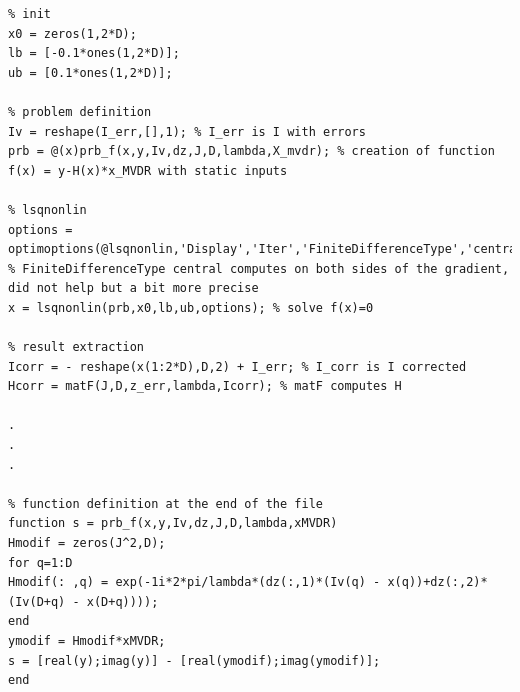 \documentclass[titlepage]{article}
\begin{document}
\begin{verbatim}
% init
x0 = zeros(1,2*D);
lb = [-0.1*ones(1,2*D)];
ub = [0.1*ones(1,2*D)];

% problem definition
Iv = reshape(I_err,[],1); % I_err is I with errors
prb = @(x)prb_f(x,y,Iv,dz,J,D,lambda,X_mvdr); % creation of function f(x) = y-H(x)*x_MVDR with static inputs

% lsqnonlin
options = optimoptions(@lsqnonlin,'Display','Iter','FiniteDifferenceType','central'); % FiniteDifferenceType central computes on both sides of the gradient, did not help but a bit more precise
x = lsqnonlin(prb,x0,lb,ub,options); % solve f(x)=0

% result extraction
Icorr = - reshape(x(1:2*D),D,2) + I_err; % I_corr is I corrected
Hcorr = matF(J,D,z_err,lambda,Icorr); % matF computes H 

.
.
.

% function definition at the end of the file
function s = prb_f(x,y,Iv,dz,J,D,lambda,xMVDR)
Hmodif = zeros(J^2,D);
for q=1:D
Hmodif(: ,q) = exp(-1i*2*pi/lambda*(dz(:,1)*(Iv(q) - x(q))+dz(:,2)*(Iv(D+q) - x(D+q))));
end 
ymodif = Hmodif*xMVDR;
s = [real(y);imag(y)] - [real(ymodif);imag(ymodif)];
end

\end{verbatim}
	
	\newpage
	\printbibliography
\end{document}
